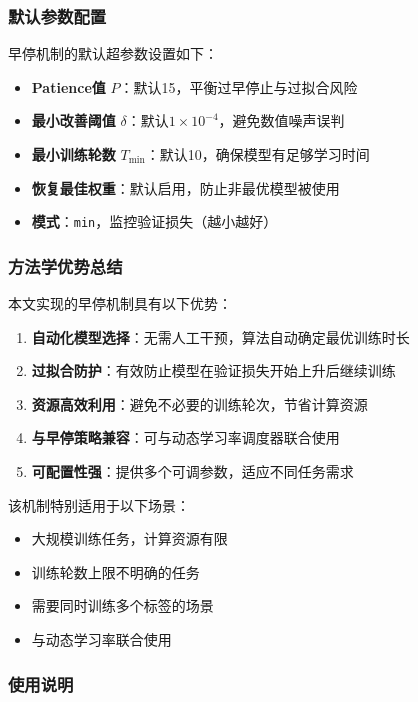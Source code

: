 \documentclass[UTF8, a4paper, 12pt]{article}
\begin{document}
\subsubsection{默认参数配置}

早停机制的默认超参数设置如下：

\begin{itemize}
    \item \textbf{Patience值} $P$：默认15，平衡过早停止与过拟合风险
    \item \textbf{最小改善阈值} $\delta$：默认$1 \times 10^{-4}$，避免数值噪声误判
    \item \textbf{最小训练轮数} $T_{\text{min}}$：默认10，确保模型有足够学习时间
    \item \textbf{恢复最佳权重}：默认启用，防止非最优模型被使用
    \item \textbf{模式}：\texttt{min}，监控验证损失（越小越好）
\end{itemize}

\subsubsection{方法学优势总结}

本文实现的早停机制具有以下优势：

\begin{enumerate}
    \item \textbf{自动化模型选择}：无需人工干预，算法自动确定最优训练时长
    \item \textbf{过拟合防护}：有效防止模型在验证损失开始上升后继续训练
    \item \textbf{资源高效利用}：避免不必要的训练轮次，节省计算资源
    \item \textbf{与早停策略兼容}：可与动态学习率调度器联合使用
    \item \textbf{可配置性强}：提供多个可调参数，适应不同任务需求
\end{enumerate}

该机制特别适用于以下场景：

\begin{itemize}
    \item 大规模训练任务，计算资源有限
    \item 训练轮数上限不明确的任务
    \item 需要同时训练多个标签的场景
    \item 与动态学习率联合使用
\end{itemize}

\subsubsection{使用说明}
\end{document}
